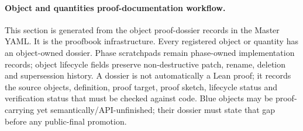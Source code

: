 \paragraph{Object and quantities proof-documentation workflow.} This section is generated from the object proof-dossier records in the Master YAML. It is the proofbook infrastructure. Every registered object or quantity has an object-owned dossier. Phase scratchpads remain phase-owned implementation records; object lifecycle fields preserve non-destructive patch, rename, deletion and supersession history. A dossier is not automatically a Lean proof; it records the source objects, definition, proof target, proof sketch, lifecycle status and verification status that must be checked against code. Blue objects may be proof-carrying yet semantically/API-unfinished; their dossier must state that gap before any public-final promotion.

\small
{}
